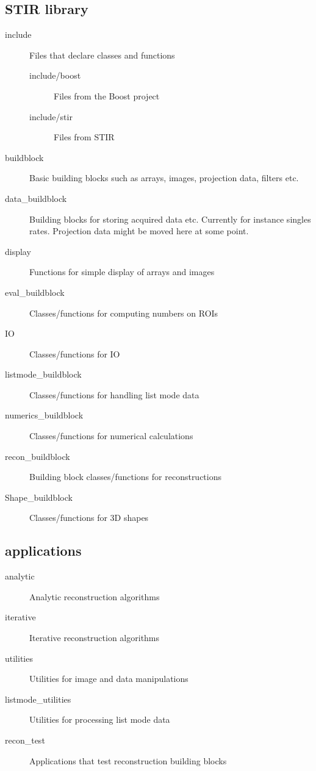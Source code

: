 \documentclass{article}
\begin{document}
\subsection{STIR library}
\begin{description}
\item[include]
Files that declare classes and functions
  \begin{description}
  \item[include/boost] Files from the Boost project
  \item[include/stir] Files from STIR
  \end{description}

\item[buildblock]
  Basic building blocks such as arrays, images, projection data, filters etc.
\item[data\_buildblock]
  Building blocks for storing acquired data etc. Currently for instance
  singles rates. Projection data might be moved here at some point.
\item[display]
  Functions for simple display of arrays and images  
\item[eval\_buildblock]
  Classes/functions for computing numbers on ROIs
\item[IO]
  Classes/functions for IO 
\item[listmode\_buildblock]
  Classes/functions for handling list mode data
\item[numerics\_buildblock]
  Classes/functions for numerical calculations
\item[recon\_buildblock]
  Building block classes/functions for reconstructions
\item[Shape\_buildblock]
  Classes/functions for 3D shapes
\end{description}

\subsection{applications}
\begin{description}
\item[analytic]
  Analytic reconstruction algorithms
\item[iterative]
  Iterative reconstruction algorithms
\item[utilities]
  Utilities for image and data manipulations
\item[listmode\_utilities]
  Utilities for processing list mode data
\item[recon\_test]
  Applications that test reconstruction building blocks
\end{description}
\end{document}
